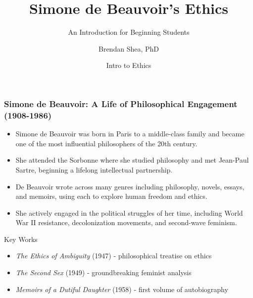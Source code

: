 \documentclass[aspectratio=169]{beamer}
\title{Simone de Beauvoir's Ethics}
\subtitle{An Introduction for Beginning Students}
\author{Brendan Shea, PhD}
\date{Intro to Ethics}
\begin{document}
	
	\begin{frame}
		\titlepage
	\end{frame}
	
	\begin{frame}
		\frametitle{Simone de Beauvoir: A Life of Philosophical Engagement (1908-1986)}
		\begin{itemize}
			\item Simone de Beauvoir was born in Paris to a middle-class family and became one of the most influential philosophers of the 20th century.
			\item She attended the Sorbonne where she studied philosophy and met Jean-Paul Sartre, beginning a lifelong intellectual partnership.
			\item De Beauvoir wrote across many genres including philosophy, novels, essays, and memoirs, using each to explore human freedom and ethics.
			\item She actively engaged in the political struggles of her time, including World War II resistance, decolonization movements, and second-wave feminism.
		\end{itemize}
		
		\begin{alertblock}{Key Works}
			\begin{itemize}
				\item \textit{The Ethics of Ambiguity} (1947) - philosophical treatise on ethics
				\item \textit{The Second Sex} (1949) - groundbreaking feminist analysis
				\item \textit{Memoirs of a Dutiful Daughter} (1958) - first volume of autobiography
			\end{itemize}
		\end{alertblock}
	\end{frame}
	
\end{document}
